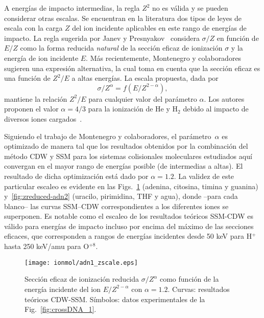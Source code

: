 A energías de impacto intermedias, la regla $Z^2$ no es válida y se 
pueden considerar otras escalas. Se encuentran en la literatura dos 
tipos de leyes de escala con la carga $Z$ del ion incidente aplicables 
en este rango de energías de impacto. La regla sugerida por Janev y 
Presnyakov~\cite{Janev:80} considera $\sigma/Z$ en función de $E/Z$ como 
la forma reducida \textit{natural} de la sección eficaz de ionización 
$\sigma$ y la energía de ion incidente $E$. Más recientemente, 
Montenegro y colaboradores~\cite{Dubois:13,Montenegro:13} sugieren una 
expresión alternativa, la cual toma en cuenta que la sección eficaz es 
una función de $Z^2/E$ a altas energías. La escala propuesta, dada por
\begin{equation}
 \sigma/Z^{\alpha}=f(E/Z^{2-\alpha}),
\label{eq:Montenegro}
\end{equation}
mantiene la relación $Z^2/E$ para cualquier valor del parámetro $\alpha$. 
Los autores proponen el valor $\alpha=4/3$ para la ionización de He y 
H$_2$ debido al impacto de diversos iones cargados~\cite{Dubois:13}. 

Siguiendo el trabajo de Montenegro y colaboradores, el 
parámetro~$\alpha$ es optimizado de manera tal que los resultados 
obtenidos por la combinación del método CDW y SSM para los sistemas 
colisionales moleculares estudiados aquí convergan en el mayor rango de 
energías posible (de intermedias a altas). El resultado de dicha 
optimización está dado por $\alpha=1.2$. La validez de este particular 
escaleo es evidente en las Figs.~\ref{fig:zreduced-adn1} (adenina, 
citosina, timina y guanina) y~\ref{fig:zreduced-adn2} (uracilo, 
pirimidina, THF y agua), donde --para cada blanco-- las curvas SSM--CDW 
correspondientes a los diferentes iones se superponen. Es notable como 
el escaleo de los resultados teóricos SSM-CDW es válido para energías de 
impacto incluso por encima del máximo de las secciones eficaces, que 
corresponden a rangos de energías incidentes desde 50 keV para H$^+$ 
hasta 250 keV/amu para O$^{+8}$.

\begin{figure}
\centering
\texttt{[image: ionmol/adn1\_zscale.eps]}
\caption[Sección eficaz de ionización reducida por $Z$ y $\alpha$ 
(Parte I).]
{Sección eficaz de ionización reducida $\sigma/Z^{\alpha}$ como función
de la energía incidente del ion $E/Z^{2-\alpha}$ con $\alpha=1.2$. 
Curvas: resultados teóricos CDW-SSM. 
Símbolos: datos experimentales de la Fig.~\ref{fig:crossDNA_1}.}
\label{fig:zreduced-adn1}
\end{figure} 


